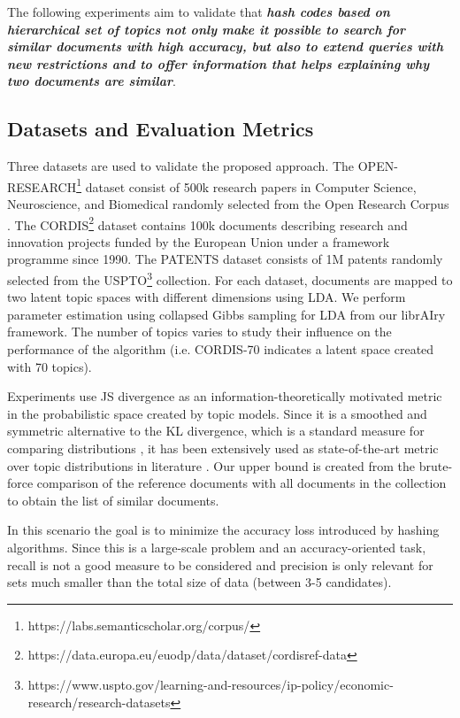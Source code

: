 The following experiments aim to validate that \textit{\textbf{hash codes based on hierarchical set of topics not only make it possible to search for similar documents with high accuracy, but also to extend queries with new restrictions and to offer information that helps explaining why two documents are similar}}.

\subsection{Datasets and Evaluation Metrics}
\label{sec:comparison-datasets}
Three datasets \citep{Badenes-Olmedo2019a} are used to validate the proposed approach. The OPEN-RESEARCH\footnote{https://labs.semanticscholar.org/corpus/} dataset consist of 500k research papers in Computer Science, Neuroscience, and Biomedical randomly selected from the Open Research Corpus \citep{Waleed2018}. The CORDIS\footnote{https://data.europa.eu/euodp/data/dataset/cordisref-data} dataset contains 100k documents describing research and innovation projects funded by the European Union under a framework programme since 1990. The PATENTS dataset consists of 1M patents randomly selected from the USPTO\footnote{https://www.uspto.gov/learning-and-resources/ip-policy/economic-research/research-datasets} collection. For each dataset, documents are mapped to two latent topic spaces with different dimensions using LDA. We perform parameter estimation using collapsed Gibbs sampling for LDA \citep{Griffiths2004b} from our librAIry  framework. The number of topics varies to study their influence on the performance of the algorithm (i.e. CORDIS-70 indicates a latent space created with 70 topics). 

Experiments use JS divergence as an information-theoretically motivated metric in the probabilistic space created by topic models. Since it is a smoothed and symmetric alternative to the KL divergence, which is a standard measure for comparing distributions \citep{Cha2007}, it has been extensively used as state-of-the-art metric over topic distributions in literature \citep{Towne2016, Aletras2017, Mao2017}. Our upper bound is created from the brute-force comparison of the reference documents with all documents in the collection to obtain the list of similar documents.  

In this scenario the goal is to minimize the accuracy loss introduced by hashing algorithms. Since this is a large-scale problem and an accuracy-oriented task, recall is not a good measure to be considered and precision is only relevant for sets much smaller than the total size of data (between 3-5 candidates).

